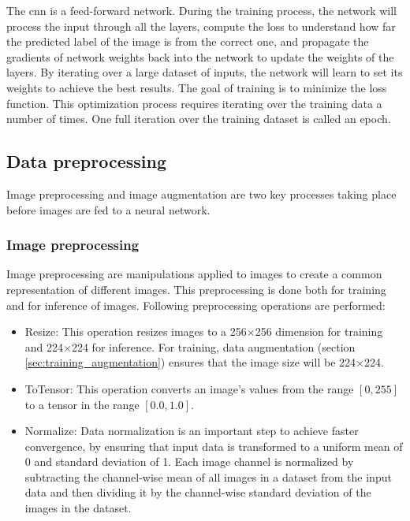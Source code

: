 The \acrshort{cnn} is a feed-forward network. During the training process, the network will process the input through all the layers, compute the loss to understand how far the predicted label of the image is from the correct one, and propagate the gradients of network weights back into the network to update the weights of the layers. By iterating over a large dataset of inputs, the network will learn to set its weights to achieve the best results. The goal of training is to minimize the loss function. This optimization process requires iterating over the training data a number of times. One full iteration over the training dataset is called an epoch.

\subsection{Data preprocessing}
Image preprocessing and image augmentation are two key processes taking place before images are fed to a neural network.

\subsubsection{Image preprocessing}
Image preprocessing are manipulations applied to images to create a common representation of different images. This preprocessing is done both for training and for inference of images. Following preprocessing operations are performed:
\begin{itemize}
    \item Resize: This operation resizes images to a 256$\times$256 dimension for training and 224$\times$224 for inference. For training, data augmentation (section \ref{sec:training_augmentation}) ensures that the image size will be 224$\times$224.
    \item ToTensor: This operation converts an image's values from the range $[0, 255]$ to a tensor in the range $[0.0, 1.0]$.
    \item Normalize: Data normalization is an important step to achieve faster convergence, by ensuring that input data is transformed to a uniform mean of 0 and standard deviation of 1. Each image channel is normalized by subtracting the channel-wise mean of all images in a dataset from the input data and then dividing it by the channel-wise standard deviation of the images in the dataset.
\end{itemize}

